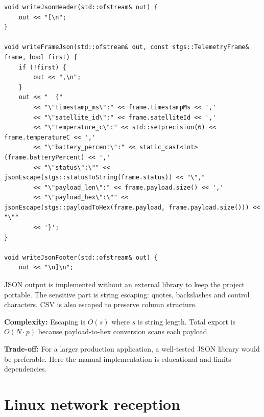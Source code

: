 \documentclass[10pt,a4paper]{article}
\newcommand{\complexity}[1]{\textbf{Complexity:} #1}
\newcommand{\tradeoff}[1]{\textbf{Trade-off:} #1}
\begin{document}
\begin{lstlisting}[caption={CSV/JSON export}]
void writeJsonHeader(std::ofstream& out) {
    out << "[\n";
}

void writeFrameJson(std::ofstream& out, const stgs::TelemetryFrame& frame, bool first) {
    if (!first) {
        out << ",\n";
    }
    out << "  {"
        << "\"timestamp_ms\":" << frame.timestampMs << ','
        << "\"satellite_id\":" << frame.satelliteId << ','
        << "\"temperature_c\":" << std::setprecision(6) << frame.temperatureC << ','
        << "\"battery_percent\":" << static_cast<int>(frame.batteryPercent) << ','
        << "\"status\":\"" << jsonEscape(stgs::statusToString(frame.status)) << "\"," 
        << "\"payload_len\":" << frame.payload.size() << ','
        << "\"payload_hex\":\"" << jsonEscape(stgs::payloadToHex(frame.payload, frame.payload.size())) << "\""
        << '}';
}

void writeJsonFooter(std::ofstream& out) {
    out << "\n]\n";
\end{lstlisting}


JSON output is implemented without an external library to keep the project portable. The sensitive part is string escaping: quotes, backslashes and control characters. CSV is also escaped to preserve column structure.

\complexity{Escaping is $O(s)$ where $s$ is string length. Total export is $O(N \cdot p)$ because payload-to-hex conversion scans each payload.}

\tradeoff{For a larger production application, a well-tested JSON library would be preferable. Here the manual implementation is educational and limits dependencies.}

\section{Linux network reception}
\end{document}
